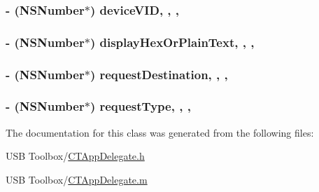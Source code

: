 \hypertarget{interface_c_t_app_delegate_ac3f78415dd122de7cebf7a3745a69da9}{
\subsubsection[{device\-V\-I\-D}]{\setlength{\rightskip}{0pt plus 5cm}-\/ (N\-S\-Number$\ast$) device\-V\-I\-D\hspace{0.3cm}{\ttfamily [read]}, {\ttfamily [write]}, {\ttfamily [atomic]}, {\ttfamily [copy]}}}\label{interface_c_t_app_delegate_ac3f78415dd122de7cebf7a3745a69da9}
\hypertarget{interface_c_t_app_delegate_a4578b9f0c04d7376bde881085bad233a}{
\subsubsection[{display\-Hex\-Or\-Plain\-Text}]{\setlength{\rightskip}{0pt plus 5cm}-\/ (N\-S\-Number$\ast$) display\-Hex\-Or\-Plain\-Text\hspace{0.3cm}{\ttfamily [read]}, {\ttfamily [write]}, {\ttfamily [atomic]}, {\ttfamily [copy]}}}\label{interface_c_t_app_delegate_a4578b9f0c04d7376bde881085bad233a}
\hypertarget{interface_c_t_app_delegate_a91630675dd1cdd1844fdd217ce52bf86}{
\subsubsection[{request\-Destination}]{\setlength{\rightskip}{0pt plus 5cm}-\/ (N\-S\-Number$\ast$) request\-Destination\hspace{0.3cm}{\ttfamily [read]}, {\ttfamily [write]}, {\ttfamily [atomic]}, {\ttfamily [copy]}}}\label{interface_c_t_app_delegate_a91630675dd1cdd1844fdd217ce52bf86}
\hypertarget{interface_c_t_app_delegate_ae0366c6888903dc8247ecf1f2dacc69d}{
\subsubsection[{request\-Type}]{\setlength{\rightskip}{0pt plus 5cm}-\/ (N\-S\-Number$\ast$) request\-Type\hspace{0.3cm}{\ttfamily [read]}, {\ttfamily [write]}, {\ttfamily [atomic]}, {\ttfamily [copy]}}}\label{interface_c_t_app_delegate_ae0366c6888903dc8247ecf1f2dacc69d}


The documentation for this class was generated from the following files\-:\begin{DoxyCompactItemize}
\item 
U\-S\-B Toolbox/\hyperlink{_c_t_app_delegate_8h}{C\-T\-App\-Delegate.\-h}\item 
U\-S\-B Toolbox/\hyperlink{_c_t_app_delegate_8m}{C\-T\-App\-Delegate.\-m}\end{DoxyCompactItemize}
